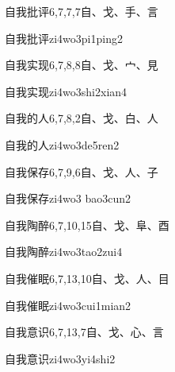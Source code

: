 \begin{entry}{自我批评}{6,7,7,7}{⾃、⼽、⼿、⾔}
  \begin{phonetics}{自我批评}{zi4wo3pi1ping2}
  \end{phonetics}
\end{entry}

\begin{entry}{自我实现}{6,7,8,8}{⾃、⼽、⼧、⾒}
  \begin{phonetics}{自我实现}{zi4wo3shi2xian4}
  \end{phonetics}
\end{entry}

\begin{entry}{自我的人}{6,7,8,2}{⾃、⼽、⽩、⼈}
  \begin{phonetics}{自我的人}{zi4wo3de5ren2}
  \end{phonetics}
\end{entry}

\begin{entry}{自我保存}{6,7,9,6}{⾃、⼽、⼈、⼦}
  \begin{phonetics}{自我保存}{zi4wo3 bao3cun2}
  \end{phonetics}
\end{entry}

\begin{entry}{自我陶醉}{6,7,10,15}{⾃、⼽、⾩、⾣}
  \begin{phonetics}{自我陶醉}{zi4wo3tao2zui4}
  \end{phonetics}
\end{entry}

\begin{entry}{自我催眠}{6,7,13,10}{⾃、⼽、⼈、⽬}
  \begin{phonetics}{自我催眠}{zi4wo3cui1mian2}
  \end{phonetics}
\end{entry}

\begin{entry}{自我意识}{6,7,13,7}{⾃、⼽、⼼、⾔}
  \begin{phonetics}{自我意识}{zi4wo3yi4shi2}
  \end{phonetics}
\end{entry}

